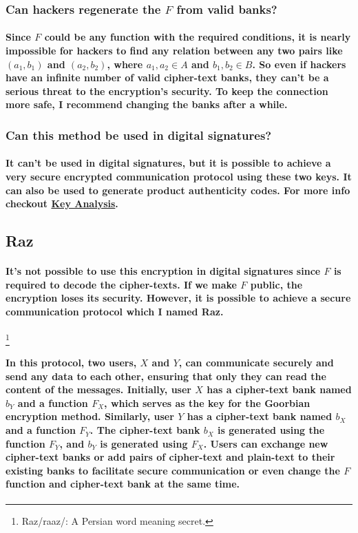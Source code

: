 \documentclass[oneside]{book}
\newcommand{\myparagraph}[1]{\paragraph{\textnormal{#1}}}
\begin{document}
\subsubsection*{Can hackers regenerate the $F$ from valid banks?}

\myparagraph{
Since $F$ could be any function with the required conditions, it is nearly impossible for hackers to find any relation between any two pairs like $(a_1, b_1)$ and $(a_2, b_2)$, where $a_1, a_2 \in A$ and $b_1, b_2 \in B$. So even if hackers have an infinite number of valid cipher-text banks, they can't be a serious threat to the encryption's security. To keep the connection more safe, I recommend changing the banks after a while.
}

\subsubsection{Can this method be used in digital signatures?}

\myparagraph{
It can't be used in digital signatures, but it is possible to achieve a very secure encrypted communication protocol using these two keys. It can also be used to generate product authenticity codes. For more info checkout \href{https://github.com/bistoyek-official/Goorb-encode/tree/main/Key\%20Analysis}{\textbf{Key Analysis}}.
}

\subsection{Raz}

\myparagraph{
It's not possible to use this encryption in digital signatures since $F$ is required to decode the cipher-texts. If we make $F$ public, the encryption loses its security. However, it is possible to achieve a secure communication protocol which I named \textbf{Raz}.
}
\footnote{Raz/raaz/: A Persian word meaning secret.}

\myparagraph{
In this protocol, two users, $X$ and $Y$, can communicate securely and send any data to each other, ensuring that only they can read the content of the messages. Initially, user $X$ has a cipher-text bank named $b_Y$ and a function $F_X$, which serves as the key for the Goorbian encryption method. Similarly, user $Y$ has a cipher-text bank named $b_X$ and a function $F_Y$. The cipher-text bank $b_X$ is generated using the function $F_Y$, and $b_Y$ is generated using $F_X$. Users can exchange new cipher-text banks or add pairs of cipher-text and plain-text to their existing banks to facilitate secure communication or even change the $F$ function and cipher-text bank at the same time.
}
\end{document}
